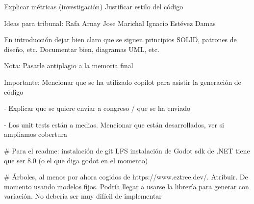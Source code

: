 Explicar métricas (investigación)
Justificar estilo del código

Ideas para tribunal:
    Rafa Arnay
    Jose Marichal
    Ignacio Estévez Damas

En introducción dejar bien claro que se siguen principios SOLID, patrones de diseño, etc. Documentar bien, diagramas UML, etc.

Nota: Pasarle antiplagio a la memoria final

Importante: Mencionar que se ha utilizado copilot para asistir la generación de código

- Explicar que se quiere enviar a congreso / que se ha enviado

- Los unit tests están a medias. Mencionar que están desarrollados, ver si ampliamos cobertura

# Para el readme:
instalación de git LFS
instalación de Godot
sdk de .NET tiene que ser 8.0 (o el que diga godot en el momento)

# Árboles, al menos por ahora cogidos de https://www.eztree.dev/. 
Atribuir. 
De momento usando modelos fijos. Podría llegar a usarse la librería para generar con variación. 
No debería ser muy difícil de implementar